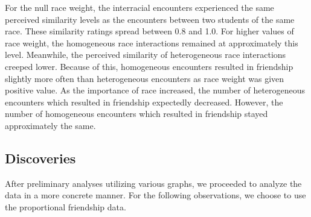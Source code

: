 
For the null race weight, the interracial encounters experienced the same perceived similarity levels as the 
encounters between two students of the same race. These similarity ratings spread between 0.8 and 1.0. For higher values of 
race weight, the homogeneous race interactions remained at approximately this level. Meanwhile, the perceived similarity of 
heterogeneous race interactions creeped lower. Because of this, homogeneous encounters resulted in friendship slightly more 
often than heterogeneous encounters as race weight was given positive value. As the importance of race increased, the number 
of heterogeneous encounters which resulted in friendship expectedly decreased. However, the number of homogeneous encounters 
which resulted in friendship stayed approximately the same.

\subsection{Discoveries}

After preliminary analyses utilizing various graphs, we proceeded to analyze the data in a more concrete manner. For the following observations, we 
choose to use the proportional friendship data.


